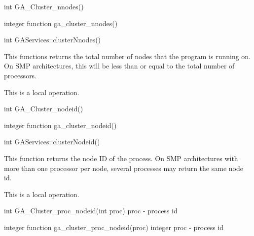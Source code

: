 \documentclass[12pt]{article}
\begin{document}

\begin{capi}
int GA_Cluster_nnodes()
\end{capi}

\begin{fapi}
integer function ga_cluster_nnodes()
\end{fapi}

\begin{cxxapi}
int GAServices::clusterNnodes()
\end{cxxapi}

\begin{desc}


This functions returns the total number of nodes that the program is running on. On SMP architectures, this will be less than or equal to the total number of processors.

This is a  local operation.
\end{desc}


\begin{capi}
int GA_Cluster_nodeid()
\end{capi}

\begin{fapi}
integer function ga_cluster_nodeid()
\end{fapi}

\begin{cxxapi}
int GAServices::clusterNodeid()
\end{cxxapi}

\begin{desc}

This function returns the node ID of the process. On SMP architectures with more than one processor per node, several processes may return the same node id.

This is a  local operation.
\end{desc}


\begin{capi}
int GA_Cluster_proc_nodeid(int proc)
   proc       - process id                                                 \access{[input]}
\end{capi}

\begin{fapi}
integer function ga_cluster_proc_nodeid(proc)
   integer proc  - process id                                              \access{[input]} 
\end{fapi}
\end{document}
